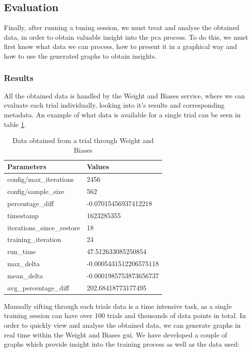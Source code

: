 
\subsection{Evaluation}

Finally, after running a tuning session, we must treat and analyse the obtained data, in order to obtain valuable insight into the \acrshort{pca} process. To do this, we must first know what data we can process, how to present it in a graphical way and how to use the generated graphs to obtain insights.

\subsubsection{Results}

All the obtained data is handled by the Weight and Biases service, where we can evaluate each trial individually, looking into it's results and corresponding metadata. An example of what data is available for a single trial can be seen in table \ref{tab:datapoints}.

\begin{table}[H]
\centering
\begin{tabular}{l|l}
Parameters                 & Values                 \\ \hline
config/max\_iterations     & 2456                   \\
config/sample\_size        & 562                    \\
percentage\_diff           & -0.07015456937412218   \\
timestamp                  & 1623285355             \\
iterations\_since\_restore & 18                     \\
training\_iteration        & 24                     \\
run\_time                  & 47.512633085250854     \\
max\_delta                 & -0.0005431512206575118 \\
mean\_delta                & -0.0001985753873656737 \\
avg\_percentage\_diff      & 202.68418773177495    
\end{tabular}
\caption{Data obtained from a trial through Weight and Biases}
\label{tab:datapoints}
\end{table}

Manually sifting through each trials data is a time intensive task, as a single training session can have over 100 trials and thousands of data points in total. In order to quickly view and analyse the obtained data, we can generate graphs in real time within the Weight and Biases \acrshort{gui}. We have developed a couple of graphs which provide insight into the training process as well as the data used:

